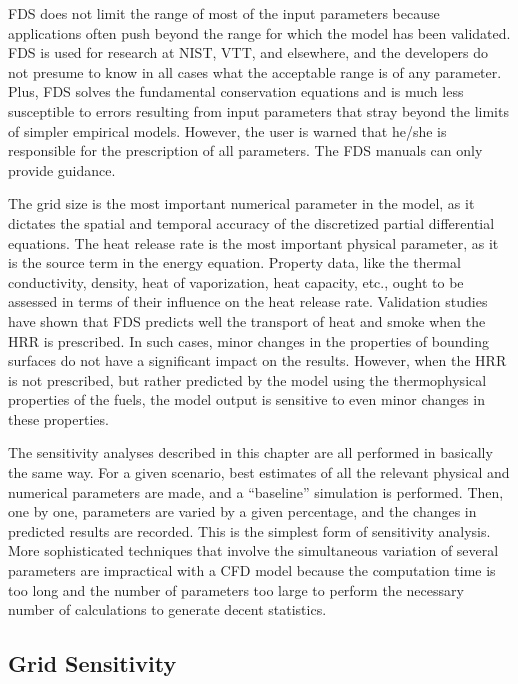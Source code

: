 \documentclass[11pt]{book}
\begin{document}
FDS does not  limit the range of most of  the input parameters because applications often push beyond the  range for which the model has been
validated.  FDS is used  for research at NIST, VTT, and elsewhere, and the developers do not presume to know in all cases what the acceptable range is
of any  parameter.  Plus,  FDS   solves  the  fundamental conservation  equations  and  is   much  less  susceptible  to  errors resulting
from  input parameters  that  stray  beyond  the limits  of simpler empirical models.  However, the user is warned  that he/she is responsible for
the prescription of all parameters.   The FDS manuals can only provide guidance.

The grid size is the  most important numerical parameter in the model, as it  dictates the spatial  and temporal accuracy of  the discretized partial
differential equations.  The heat  release rate  is  the most important physical parameter,  as it is the source  term in the energy equation.
Property data, like  the thermal conductivity, density, heat of vaporization,  heat capacity, etc., ought to be  assessed in terms of their
influence on  the heat release rate. Validation studies \cite{FDS_Validation_Guide} have shown that FDS predicts well the transport of heat and smoke when the HRR is prescribed.
In  such cases, minor changes in the properties of  bounding  surfaces  do  not  have  a  significant  impact  on  the results. However, when the HRR
is not prescribed, but rather predicted by the  model using  the thermophysical properties  of the  fuels, the model output is sensitive to even
minor changes in these properties.

The sensitivity  analyses described in this chapter  are all performed in basically the same way. For a given scenario, best estimates of all the
relevant  physical  and  numerical  parameters are  made,  and  a ``baseline'' simulation is performed. Then, one by one, parameters are varied by a
given percentage, and the changes in predicted results are recorded.  This is  the simplest  form of  sensitivity  analysis. More sophisticated
techniques that involve  the simultaneous  variation of several  parameters  are impractical  with  a  CFD  model because  the computation time is
too long and the number of parameters too large to perform  the  necessary  number  of calculations  to  generate  decent statistics.



\subsection{Grid Sensitivity}
\end{document}

